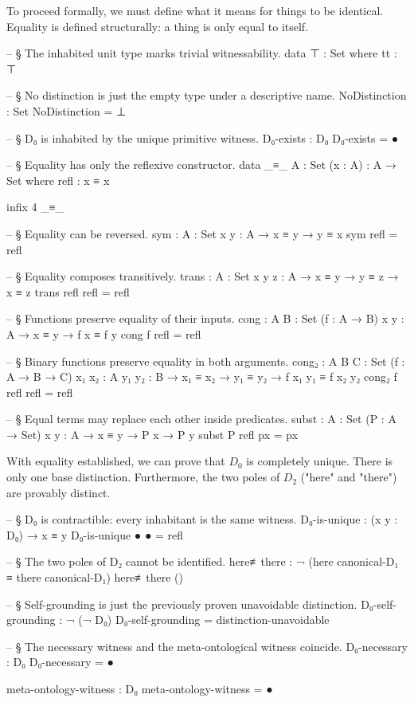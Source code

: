 \documentclass[11pt,a4paper]{book}
\begin{document}
To proceed formally, we must define what it means for things to be identical. Equality is defined structurally: a thing is only equal to itself.

\begin{code}
-- § The inhabited unit type marks trivial witnessability.
data ⊤ : Set where
  tt : ⊤

-- § No distinction is just the empty type under a descriptive name.
NoDistinction : Set
NoDistinction = ⊥

-- § D₀ is inhabited by the unique primitive witness.
D₀-exists : D₀
D₀-exists = ●

-- § Equality has only the reflexive constructor.
data _≡_ {A : Set} (x : A) : A → Set where
  refl : x ≡ x

infix 4 _≡_

-- § Equality can be reversed.
sym : {A : Set} {x y : A} → x ≡ y → y ≡ x
sym refl = refl

-- § Equality composes transitively.
trans : {A : Set} {x y z : A} → x ≡ y → y ≡ z → x ≡ z
trans refl refl = refl

-- § Functions preserve equality of their inputs.
cong : {A B : Set} (f : A → B) {x y : A} → x ≡ y → f x ≡ f y
cong f refl = refl

-- § Binary functions preserve equality in both arguments.
cong₂ : {A B C : Set} (f : A → B → C) {x₁ x₂ : A} {y₁ y₂ : B} 
      → x₁ ≡ x₂ → y₁ ≡ y₂ → f x₁ y₁ ≡ f x₂ y₂
cong₂ f refl refl = refl

-- § Equal terms may replace each other inside predicates.
subst : {A : Set} (P : A → Set) {x y : A} → x ≡ y → P x → P y
subst P refl px = px
\end{code}

With equality established, we can prove that $D_0$ is completely unique. There is only one base distinction. Furthermore, the two poles of $D_2$ ("here" and "there") are provably distinct.

\begin{code}
-- § D₀ is contractible: every inhabitant is the same witness.
D₀-is-unique : (x y : D₀) → x ≡ y
D₀-is-unique ● ● = refl

-- § The two poles of D₂ cannot be identified.
here≢there : ¬ (here canonical-D₁ ≡ there canonical-D₁)
here≢there ()

-- § Self-grounding is just the previously proven unavoidable distinction.
D₀-self-grounding : ¬ (¬ D₀)
D₀-self-grounding = distinction-unavoidable

-- § The necessary witness and the meta-ontological witness coincide.
D₀-necessary : D₀
D₀-necessary = ●

meta-ontology-witness : D₀
meta-ontology-witness = ●
\end{code}
\end{document}
